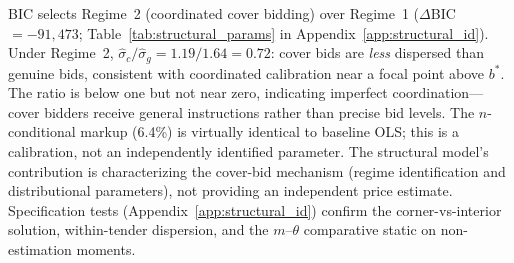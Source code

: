 BIC selects Regime~2 (coordinated cover bidding) over Regime~1
($\Delta$BIC~$= -91{,}473$;
Table~\ref{tab:structural_params} in
Appendix~\ref{app:structural_id}). Under Regime~2,
$\hat{\sigma}_c / \hat{\sigma}_g = 1.19/1.64 = 0.72$: cover bids are
\emph{less} dispersed than genuine bids, consistent with coordinated
calibration near a focal point above $b^*$. The ratio is below one but
not near zero, indicating imperfect coordination---cover bidders receive
general instructions rather than precise bid levels. The $n$-conditional
markup (6.4\%) is virtually identical to baseline OLS; this is a
calibration, not an independently identified parameter. The structural
model's contribution is characterizing the cover-bid mechanism (regime
identification and distributional parameters), not providing an
independent price estimate. Specification tests
(Appendix~\ref{app:structural_id}) confirm the corner-vs-interior
solution, within-tender dispersion, and the $m$--$\theta$ comparative
static on non-estimation moments.
